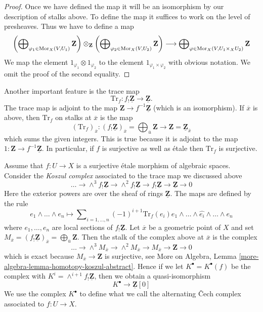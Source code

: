 \begin{proof}
Once we have defined the map it will be an isomorphism by our description
of stalks above. To define the map it suffices to work on the level of
presheaves. Thus we have to define a map
$$
\left(\bigoplus\nolimits_{\varphi_1 \in \operatorname{Mor}_X(V, U_1)} \mathbf{Z}\right)
\otimes_{\mathbf{Z}}
\left(\bigoplus\nolimits_{\varphi_2 \in \operatorname{Mor}_X(V, U_2)} \mathbf{Z}\right)
\longrightarrow
\bigoplus\nolimits_{\varphi \in \operatorname{Mor}_X(V, U_1 \times_X U_2)}
\mathbf{Z}
$$
We map the element $1_{\varphi_1} \otimes 1_{\varphi_2}$ to the element
$1_{\varphi_1 \times \varphi_2}$ with obvious notation. We omit the proof
of the second equality.
\end{proof}

Another important feature is the trace map
$$
\text{Tr}_f : f_!\underline{\mathbf{Z}} \longrightarrow \underline{\mathbf{Z}}.
$$
The trace map is adjoint to the
map $\mathbf{Z} \to f^{-1}\underline{\mathbf{Z}}$ (which is an isomorphism).
If $\overline{x}$ is above, then $\text{Tr}_f$ on stalks at $\overline{x}$
is the map
$$
(\text{Tr}_f)_{\overline{x}} :
(f_!\underline{\mathbf{Z}})_{\overline{x}} =
\bigoplus\nolimits_{\overline{u}} \mathbf{Z}
\longrightarrow
\mathbf{Z} = \underline{\mathbf{Z}}_{\overline{x}}
$$
which sums the given integers. This is true because it is adjoint to the map
$1 : \mathbf{Z} \to f^{-1}\underline{\mathbf{Z}}$. In particular, if
$f$ is surjective as well as \'etale then $\text{Tr}_f$ is surjective.

\medskip\noindent
Assume that $f : U \to X$ is a surjective \'etale
morphism of algebraic spaces. Consider the {\it Koszul complex}
associated to the trace map we discussed above
$$
\ldots \to \wedge^3f_!\underline{\mathbf{Z}} \to
\wedge^2f_!\underline{\mathbf{Z}} \to f_!\underline{\mathbf{Z}} \to
\underline{\mathbf{Z}} \to 0
$$
Here the exterior powers are over the sheaf of rings $\underline{\mathbf{Z}}$.
The maps are defined by the rule
$$
e_1 \wedge \ldots \wedge e_n \longmapsto
\sum\nolimits_{i = 1, \ldots, n} (-1)^{i + 1}
\text{Tr}_f(e_i)
e_1 \wedge \ldots \wedge \widehat{e_i} \wedge \ldots \wedge e_n
$$
where $e_1, \ldots, e_n$ are local sections of $f_!\underline{\mathbf{Z}}$.
Let $\overline{x}$ be a geometric point of $X$ and set
$M_{\overline{x}} = (f_!\underline{\mathbf{Z}})_{\overline{x}} =
\bigoplus_{\overline{u}} \mathbf{Z}$. Then the stalk of the complex above at
$\overline{x}$ is the complex
$$
\ldots \to \wedge^3 M_{\overline{x}} \to \wedge^2 M_{\overline{x}}
\to M_{\overline{x}} \to \mathbf{Z} \to 0
$$
which is exact because $M_{\overline{x}} \to \mathbf{Z}$ is surjective, see
More on Algebra, Lemma \ref{more-algebra-lemma-homotopy-koszul-abstract}.
Hence if we let $K^\bullet = K^\bullet(f)$ be the complex with
$K^i = \wedge^{i + 1}f_!\underline{\mathbf{Z}}$, then we obtain a
quasi-isomorphism
\begin{equation}
\label{equation-quasi-isomorphism}
K^\bullet \longrightarrow \underline{\mathbf{Z}}[0]
\end{equation}
We use the complex $K^\bullet$ to define what we call
the alternating {\v C}ech complex associated to $f : U \to X$.

